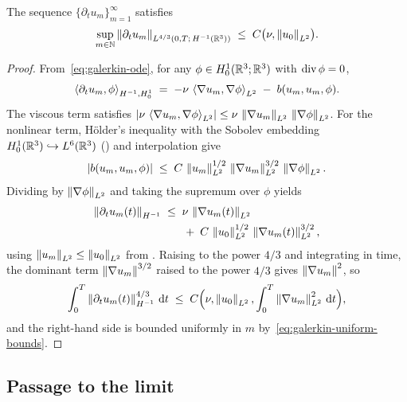 \begin{lemma}\label{lem:time-derivative-bound}
  The sequence $\{\partial_{t} u_{m}\}_{m=1}^{\infty}$ satisfies
  \begin{equation}\label{eq:time-derivative-bound}
    \sup_{m \in \mathbb{N}}
    \left\lVert \partial_{t} u_{m} \right\rVert_{L^{4/3}(0,T;\,H^{-1}(\mathbb{R}^{3}))}
    \;\le\;
    C\bigl(\nu, \left\lVert u_{0} \right\rVert_{L^{2}}\bigr).
  \end{equation}
\end{lemma}

\begin{proof}
  From~\eqref{eq:galerkin-ode}, for any $\phi \in H^{1}_0(\mathbb{R}^{3}; \mathbb{R}^{3})$ with
  $\operatorname{div} \phi = 0$,
  \[
    \left\langle \partial_{t} u_{m}, \phi \right\rangle_{H^{-1}, H^{1}_0}
    \;=\;
    -\nu\,\left\langle \nabla u_{m}, \nabla \phi \right\rangle_{L^{2}}
    \;-\;
    b(u_{m}, u_{m}, \phi).
  \]
  The viscous term satisfies
  $\left\lvert \nu\,\left\langle \nabla u_{m}, \nabla \phi \right\rangle_{L^{2}} \right\rvert \le
  \nu\,\left\lVert \nabla u_{m} \right\rVert_{L^{2}}\,\left\lVert \nabla \phi \right\rVert_{L^{2}}$.
  For the nonlinear term, H\"{o}lder's inequality with the Sobolev embedding
  $H^{1}_0(\mathbb{R}^{3}) \hookrightarrow L^{6}(\mathbb{R}^{3})$
  () and interpolation give
  \[
    \left\lvert b(u_{m}, u_{m}, \phi) \right\rvert
    \;\le\;
    C\,\left\lVert u_{m} \right\rVert_{L^{2}}^{1/2}\,\left\lVert \nabla u_{m} \right\rVert_{L^{2}}^{3/2}
    \,\left\lVert \nabla \phi \right\rVert_{L^{2}}.
  \]
  Dividing by $\left\lVert \nabla \phi \right\rVert_{L^{2}}$ and taking the supremum over $\phi$ yields
  \begin{align*}
    \left\lVert \partial_{t} u_{m}(t) \right\rVert_{H^{-1}}
    &\;\le\;
    \nu\,\left\lVert \nabla u_{m}(t) \right\rVert_{L^{2}} \\
    &\qquad
    +\;C\,\left\lVert u_{0} \right\rVert_{L^{2}}^{1/2}\,
    \left\lVert \nabla u_{m}(t) \right\rVert_{L^{2}}^{3/2},
  \end{align*}
  using $\left\lVert u_{m} \right\rVert_{L^{2}} \le \left\lVert u_{0} \right\rVert_{L^{2}}$ from
  .  Raising to the power $4/3$ and integrating in time,
  the dominant term $\left\lVert \nabla u_{m} \right\rVert^{3/2}$ raised to the power $4/3$
  gives $\left\lVert \nabla u_{m} \right\rVert^{2}$, so
  \[
    \int_{0}^{T} \left\lVert \partial_{t} u_{m}(t) \right\rVert_{H^{-1}}^{4/3} \,\mathrm{d} t
    \;\le\;
    C\Bigl(\nu, \left\lVert u_{0} \right\rVert_{L^{2}},
    \int_{0}^{T} \left\lVert \nabla u_{m} \right\rVert_{L^{2}}^{2} \,\mathrm{d} t\Bigr),
  \]
  and the right-hand side is bounded uniformly in $m$
  by~\eqref{eq:galerkin-uniform-bounds}.
\end{proof}

\subsection{Passage to the limit}

